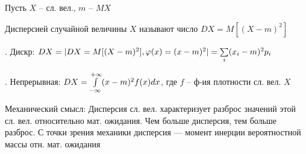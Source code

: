 
Пусть $X$ -- сл. вел., $m$ -- $MX$

\OPR Дисперсией случайной величины
$X$ называют число $DX=M[(X-m)^2]$

. Дискр: $DX=|DX=M[(X-m)^2],\varphi(x)=(x-m)^2|=\sum\limits_{i}(x_i-m)^2p_i$

. Непрерывная: $DX=\int\limits_{-\infty}^{+\infty}(x-m)^2f(x)dx$, где $f$ -- ф-ия плотности сл. вел. $X$

Механический смысл: Дисперсия сл. вел. характеризует разброс значений этой сл. вел. относительно мат. ожидания. Чем больше дисперсия,
тем больше разброс.
С точки зрения механики дисперсия — момент инерции вероятностной массы
отн. мат. ожидания

